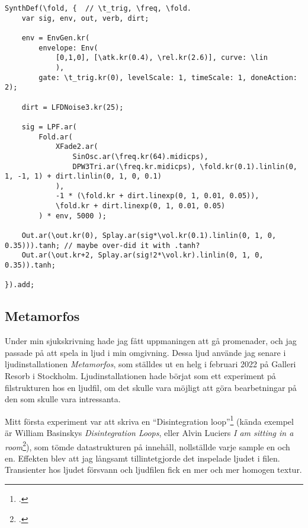 \documentclass{article}
\renewcommand{\baselinestretch}{1.5}
\begin{document}
\renewcommand{\baselinestretch}{1}
\begin{lstlisting}[style=SuperCollider-IDE, caption=Fold-SynthDef från K87-89]
SynthDef(\fold, {  // \t_trig, \freq, \fold.
	var sig, env, out, verb, dirt;

	env = EnvGen.kr(
		envelope: Env(
			[0,1,0], [\atk.kr(0.4), \rel.kr(2.6)], curve: \lin
			), 
		gate: \t_trig.kr(0), levelScale: 1, timeScale: 1, doneAction: 2);

	dirt = LFDNoise3.kr(25);

	sig = LPF.ar( 
		Fold.ar(
			XFade2.ar(
				SinOsc.ar(\freq.kr(64).midicps), 
				DPW3Tri.ar(\freq.kr.midicps), \fold.kr(0.1).linlin(0, 1, -1, 1) + dirt.linlin(0, 1, 0, 0.1)
			),
			-1 * (\fold.kr + dirt.linexp(0, 1, 0.01, 0.05)),
			\fold.kr + dirt.linexp(0, 1, 0.01, 0.05)
		) * env, 5000 );

	Out.ar(\out.kr(0), Splay.ar(sig*\vol.kr(0.1).linlin(0, 1, 0, 0.35))).tanh; // maybe over-did it with .tanh?
	Out.ar(\out.kr+2, Splay.ar(sig!2*\vol.kr).linlin(0, 1, 0, 0.35)).tanh;

}).add;
\end{lstlisting}
\renewcommand{\baselinestretch}{1.5}

\subsection{Metamorfos}
Under min sjukskrivning hade jag fått uppmaningen att gå promenader, och jag passade på att spela in ljud i
min omgivning. Dessa ljud använde jag senare i ljudinstallationen \emph{Metamorfos}, som ställdes ut en helg i
februari 2022 på Galleri Resorb i Stockholm. Ljudinstallationen hade börjat som ett experiment på
filstrukturen hos en ljudfil, om det skulle vara möjligt att göra bearbetningar på den som skulle vara
intressanta. 

Mitt första experiment var att skriva en ``Disintegration loop''\footcite{Basinski} (kända
exempel är William Basinskys \emph{Disintegration Loops}, eller Alvin Luciers \emph{I am sitting in a
room}\footcite{Lucier}), som
tömde datastrukturen på innehåll, nollställde varje sample en och en. Effekten blev att jag långsamt
tillintetgjorde det inspelade ljudet i filen. Transienter hos ljudet försvann och ljudfilen fick en mer och
mer homogen textur.
\end{document}
